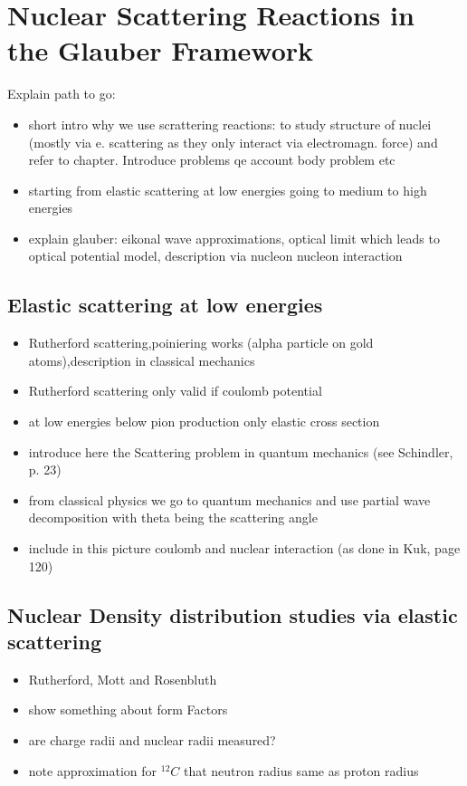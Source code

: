 \section{Nuclear Scattering Reactions in the Glauber Framework}\label{sec:reac_model}
Explain path to go:
\begin{itemize}
\item short intro why we use scrattering reactions: to study structure of nuclei (mostly via e. scattering as they only interact via electromagn. force) and refer to chapter. Introduce problems qe account body problem etc
\item starting from elastic scattering at low energies going to medium to high energies
\item explain glauber: eikonal wave approximations, optical limit which leads to optical potential model, description via nucleon nucleon interaction
\end{itemize}
\subsection{Elastic scattering at low energies}
\begin{itemize}
\item Rutherford scattering,poiniering works (alpha particle on gold atoms),description in classical mechanics
\item Rutherford scattering only valid if coulomb potential
\item at low energies below pion production only elastic cross section
\item introduce here the Scattering problem in quantum mechanics (see Schindler, p. 23)
\item from classical physics we go to quantum mechanics and use partial wave decomposition with theta being the scattering angle
\item include in this picture coulomb and nuclear interaction (as done in Kuk, page 120)
\end{itemize}
\subsection{Nuclear Density distribution studies via elastic scattering}
\begin{itemize}
\item Rutherford, Mott and Rosenbluth
\item  show something about form Factors
\item  are charge radii and nuclear radii measured?
\item note approximation for $^{12}C$ that neutron radius same as proton radius
\end{itemize}
